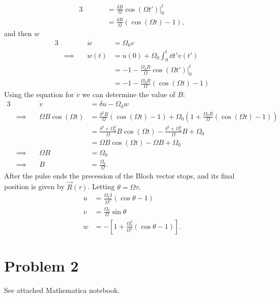 \documentclass[12pt]{article}
\begin{document}
\begin{enumerate}[label=(\alph*)]
\begin{alignat*}{3}
        &\quad & &= \frac{\delta B}{\Omega}\cos(\Omega t')\big\vert_0^t \\
        &\quad & &= \frac{\delta B}{\Omega}\left(\cos(\Omega t) - 1\right),
    \end{alignat*}
    and then $w$
    \begin{alignat*}{3}
        &\quad & \dot{w} &= \Omega_0 v \\
        &\implies\quad & w(t) &= u(0) + \Omega_0\int_0^t\dd t' v(t') \\
        &\quad & &= -1 -\frac{\Omega_0 B}{\Omega}\cos(\Omega t')\big\vert_0^t \\
        &\quad & &= -1 -\frac{\Omega_0 B}{\Omega}\left(\cos(\Omega t) - 1\right)
    \end{alignat*}
    Using the equation for $\dot{v}$ we can determine the value of $B$:
    \begin{alignat*}{3}
        &\quad & \dot{v} &= \delta u - \Omega_0 w \\
        &\implies\quad & \Omega B \cos(\Omega t) & = \frac{\delta^2B}{\Omega}\left(\cos(\Omega t) - 1\right) + \Omega_0\left(1 + \frac{\Omega_0B}{\Omega}\left(\cos(\Omega t) - 1\right)\right) \\
        &\quad & &= \frac{\delta^2 + \Omega_0^2}{\Omega}B\cos(\Omega t) - \frac{\delta^2 + \Omega_0^2}{\Omega}B + \Omega_0 \\
        &\quad & &= \Omega B\cos(\Omega t) - \Omega B  + \Omega_0 \\
        &\implies\quad & \Omega B &= \Omega_0 \\
        &\implies\quad & B &= \frac{\Omega_0}{\Omega}.
    \end{alignat*}
    After the pulse ends the precession of the Bloch vector stops, and its final position is given by $\vec{R}(\tau)$. Letting $\theta = \Omega\tau$,
    \begin{align*}
        u &= \frac{\Omega_0\delta}{\Omega^2}\left(\cos\theta - 1\right) \\
        v &= \frac{\Omega_0}{\Omega}\sin\theta \\
        w &= -\left[1 + \frac{\Omega_0^2}{\Omega^2}\left(\cos\theta - 1\right)\right].
    \end{align*}
\end{enumerate}

\section*{Problem 2}
See attached Mathematica notebook.
\end{document}
